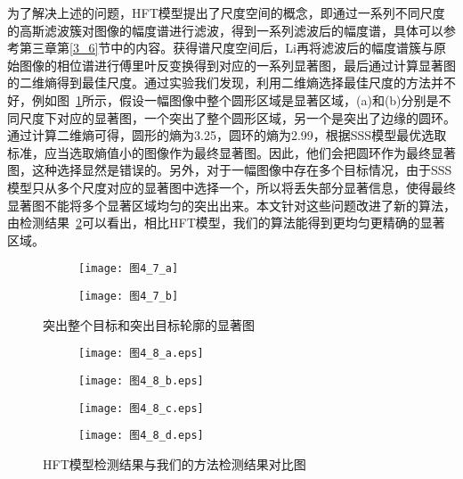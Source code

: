 为了解决上述的问题，HFT模型\cite{LiJianTPAMI2013Scale}提出了尺度空间的概念，即通过一系列不同尺度的高斯滤波簇对图像的幅度谱进行滤波，得到一系列滤波后的幅度谱，具体可以参考第三章第\ref{3_6}节中的内容。获得谱尺度空间后，Li再将滤波后的幅度谱簇与原始图像的相位谱进行傅里叶反变换得到对应的一系列显著图，最后通过计算显著图的二维熵得到最佳尺度。通过实验我们发现，利用二维熵选择最佳尺度的方法并不好，例如图~\ref{图4_7}所示，假设一幅图像中整个圆形区域是显著区域，(a)和(b)分别是不同尺度下对应的显著图，一个突出了整个圆形区域，另一个是突出了边缘的圆环。通过计算二维熵可得，圆形的熵为3.25，圆环的熵为2.99，根据SSS模型最优选取标准，应当选取熵值小的图像作为最终显著图。因此，他们会把圆环作为最终显著图，这种选择显然是错误的。另外，对于一幅图像中存在多个目标情况，由于SSS模型只从多个尺度对应的显著图中选择一个，所以将丢失部分显著信息，使得最终显著图不能将多个显著区域均匀的突出出来。本文针对这些问题改进了新的算法，由检测结果~\ref{图4_8}可以看出，相比HFT模型，我们的算法能得到更均匀更精确的显著区域。
\begin{figure}[t]
  \centering%
  \begin{subfigure}{0.39\textwidth}
    \texttt{[image: 图4\_7\_a]}
    \caption{}
  \end{subfigure}
  \hspace{4em}%
  \begin{subfigure}{0.4\textwidth}
    \texttt{[image: 图4\_7\_b]}
    \caption{}
  \end{subfigure}
  \caption{突出整个目标和突出目标轮廓的显著图}
  \label{图4_7}
\end{figure}
\begin{figure}[b]
  \centering%
  \begin{subfigure}{4cm}
    \texttt{[image: 图4\_8\_a.eps]}
    \caption{}
  \end{subfigure}
  \hspace{4em}%
  \begin{subfigure}{0.25\textwidth}
    \texttt{[image: 图4\_8\_b.eps]}
    \caption{}
  \end{subfigure}
  \hspace{4em}%
  \begin{subfigure}{0.25\textwidth}
    \texttt{[image: 图4\_8\_c.eps]}
    \caption{}
  \end{subfigure}
  \hspace{4em}%
  \begin{subfigure}{0.25\textwidth}
    \texttt{[image: 图4\_8\_d.eps]}
    \caption{}
  \end{subfigure}
  \caption{HFT模型检测结果与我们的方法检测结果对比图}
  \label{图4_8}
\end{figure}

